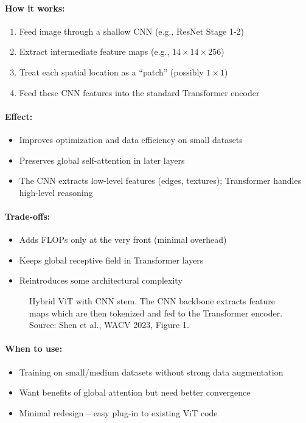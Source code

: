 \documentclass{article}
\begin{document}
\paragraph{How it works:}
\begin{enumerate}
\item Feed image through a shallow CNN (e.g., ResNet Stage 1-2)
\item Extract intermediate feature maps (e.g., $14 \times 14 \times 256$)
\item Treat each spatial location as a ``patch'' (possibly $1 \times 1$)
\item Feed these CNN features into the standard Transformer encoder
\end{enumerate}

\paragraph{Effect:}
\begin{itemize}
\item Improves optimization and data efficiency on small datasets
\item Preserves global self-attention in later layers
\item The CNN extracts low-level features (edges, textures); Transformer handles high-level reasoning
\end{itemize}

\paragraph{Trade-offs:}
\begin{itemize}
\item Adds FLOPs only at the very front (minimal overhead)
\item Keeps global receptive field in Transformer layers
\item Reintroduces some architectural complexity
\end{itemize}

\begin{figure}[h]
\centering
{}
\caption{Hybrid ViT with CNN stem. The CNN backbone extracts feature maps which are then tokenized and fed to the Transformer encoder. Source: Shen et al., WACV 2023, Figure 1.}
\end{figure}

\paragraph{When to use:}
\begin{itemize}
\item Training on small/medium datasets without strong data augmentation
\item Want benefits of global attention but need better convergence
\item Minimal redesign -- easy plug-in to existing ViT code
\end{itemize}
\end{document}
